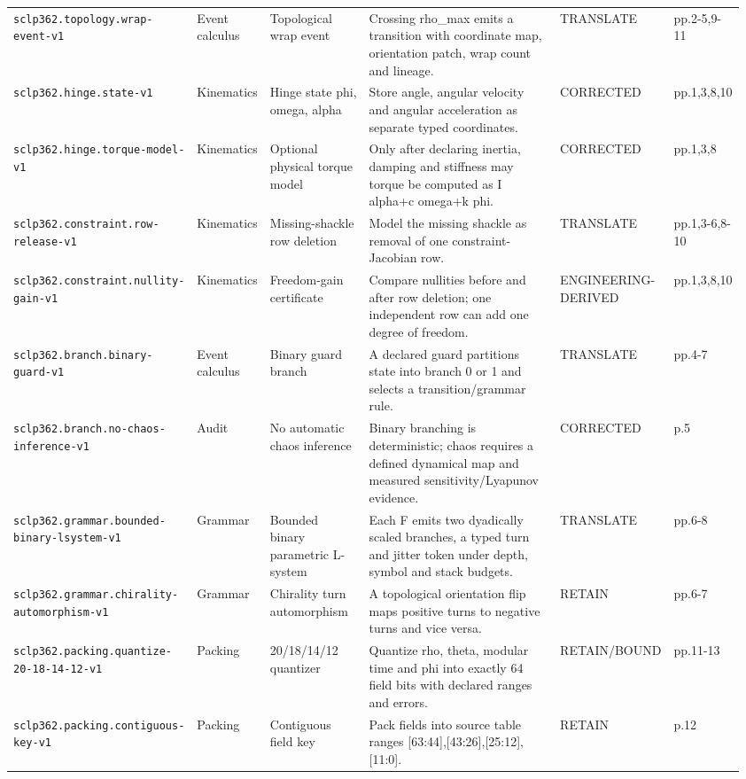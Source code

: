 \begin{landscape}
\begin{longtable}{p{0.19\linewidth} p{0.08\linewidth} p{0.15\linewidth} p{0.37\linewidth} p{0.10\linewidth} p{0.07\linewidth}}
\texttt{sclp362.topology.wrap-event-v1} & Event calculus & Topological wrap event & Crossing rho\_max emits a transition with coordinate map, orientation patch, wrap count and lineage. & TRANSLATE & pp.2-5,9-11\\
\texttt{sclp362.hinge.state-v1} & Kinematics & Hinge state phi, omega, alpha & Store angle, angular velocity and angular acceleration as separate typed coordinates. & CORRECTED & pp.1,3,8,10\\
\texttt{sclp362.hinge.torque-model-v1} & Kinematics & Optional physical torque model & Only after declaring inertia, damping and stiffness may torque be computed as I alpha+c omega+k phi. & CORRECTED & pp.1,3,8\\
\texttt{sclp362.constraint.row-release-v1} & Kinematics & Missing-shackle row deletion & Model the missing shackle as removal of one constraint-Jacobian row. & TRANSLATE & pp.1,3-6,8-10\\
\texttt{sclp362.constraint.nullity-gain-v1} & Kinematics & Freedom-gain certificate & Compare nullities before and after row deletion; one independent row can add one degree of freedom. & ENGINEERING-DERIVED & pp.1,3,8,10\\
\texttt{sclp362.branch.binary-guard-v1} & Event calculus & Binary guard branch & A declared guard partitions state into branch 0 or 1 and selects a transition/grammar rule. & TRANSLATE & pp.4-7\\
\texttt{sclp362.branch.no-chaos-inference-v1} & Audit & No automatic chaos inference & Binary branching is deterministic; chaos requires a defined dynamical map and measured sensitivity/Lyapunov evidence. & CORRECTED & p.5\\
\texttt{sclp362.grammar.bounded-binary-lsystem-v1} & Grammar & Bounded binary parametric L-system & Each F emits two dyadically scaled branches, a typed turn and jitter token under depth, symbol and stack budgets. & TRANSLATE & pp.6-8\\
\texttt{sclp362.grammar.chirality-automorphism-v1} & Grammar & Chirality turn automorphism & A topological orientation flip maps positive turns to negative turns and vice versa. & RETAIN & pp.6-7\\
\texttt{sclp362.packing.quantize-20-18-14-12-v1} & Packing & 20/18/14/12 quantizer & Quantize rho, theta, modular time and phi into exactly 64 field bits with declared ranges and errors. & RETAIN/BOUND & pp.11-13\\
\texttt{sclp362.packing.contiguous-key-v1} & Packing & Contiguous field key & Pack fields into source table ranges [63:44],[43:26],[25:12],[11:0]. & RETAIN & p.12\\

\end{longtable}
\end{landscape}

